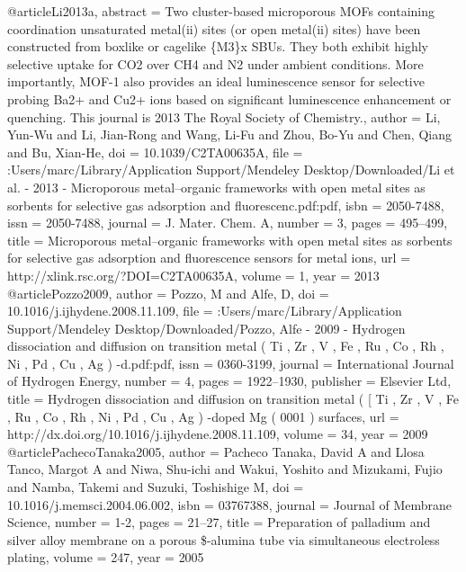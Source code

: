 @article{Li2013a,
abstract = {Two cluster-based microporous MOFs containing coordination unsaturated metal(ii) sites (or open metal(ii) sites) have been constructed from boxlike or cagelike {\{}M3{\}}x SBUs. They both exhibit highly selective uptake for CO2 over CH4 and N2 under ambient conditions. More importantly, MOF-1 also provides an ideal luminescence sensor for selective probing Ba2+ and Cu2+ ions based on significant luminescence enhancement or quenching. This journal is {\textcopyright} 2013 The Royal Society of Chemistry.},
author = {Li, Yun-Wu and Li, Jian-Rong and Wang, Li-Fu and Zhou, Bo-Yu and Chen, Qiang and Bu, Xian-He},
doi = {10.1039/C2TA00635A},
file = {:Users/marc/Library/Application Support/Mendeley Desktop/Downloaded/Li et al. - 2013 - Microporous metal–organic frameworks with open metal sites as sorbents for selective gas adsorption and fluorescenc.pdf:pdf},
isbn = {2050-7488},
issn = {2050-7488},
journal = {J. Mater. Chem. A},
number = {3},
pages = {495--499},
title = {{Microporous metal–organic frameworks with open metal sites as sorbents for selective gas adsorption and fluorescence sensors for metal ions}},
url = {http://xlink.rsc.org/?DOI=C2TA00635A},
volume = {1},
year = {2013}
}
@article{Pozzo2009,
author = {Pozzo, M and Alfe, D},
doi = {10.1016/j.ijhydene.2008.11.109},
file = {:Users/marc/Library/Application Support/Mendeley Desktop/Downloaded/Pozzo, Alfe - 2009 - Hydrogen dissociation and diffusion on transition metal ( Ti , Zr , V , Fe , Ru , Co , Rh , Ni , Pd , Cu , Ag ) -d.pdf:pdf},
issn = {0360-3199},
journal = {International Journal of Hydrogen Energy},
number = {4},
pages = {1922--1930},
publisher = {Elsevier Ltd},
title = {{Hydrogen dissociation and diffusion on transition metal ( [ Ti , Zr , V , Fe , Ru , Co , Rh , Ni , Pd , Cu , Ag ) -doped Mg ( 0001 ) surfaces}},
url = {http://dx.doi.org/10.1016/j.ijhydene.2008.11.109},
volume = {34},
year = {2009}
}
@article{PachecoTanaka2005,
author = {{Pacheco Tanaka}, David A and {Llosa Tanco}, Margot A and Niwa, Shu-ichi and Wakui, Yoshito and Mizukami, Fujio and Namba, Takemi and Suzuki, Toshishige M},
doi = {10.1016/j.memsci.2004.06.002},
isbn = {03767388},
journal = {Journal of Membrane Science},
number = {1-2},
pages = {21--27},
title = {{Preparation of palladium and silver alloy membrane on a porous {\$}\alpha{\$}-alumina tube via simultaneous electroless plating}},
volume = {247},
year = {2005}
}
